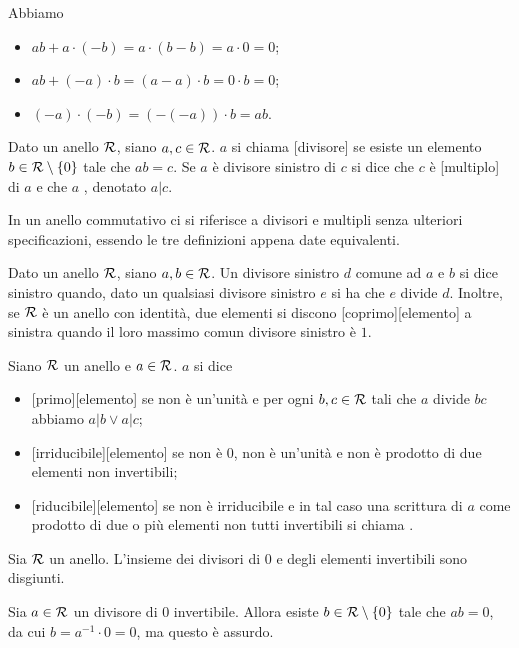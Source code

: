 \Proof Abbiamo
\begin{itemize}
	\item $ab + a \cdot (-b) = a \cdot (b - b) = a \cdot 0 = 0$;
	\item $ab + (-a) \cdot b = (a - a) \cdot b = 0 \cdot b = 0$;
	\item $(-a) \cdot (-b) = (-(-a)) \cdot b = ab$. \EndProof
\end{itemize}
\begin{Definition}
	Dato un anello $\mathcal{R}$, siano $a, c \in \mathcal{R}$. $a$ si chiama [divisore] se esiste un elemento $b \in \mathcal{R} \setminus \lbrace 0 \rbrace$ tale che $ab = c$. Se $a$ \`e divisore sinistro di $c$ si dice che $c$ \`e [multiplo] di $a$ e che $a$ , denotato $a|c$.
\end{Definition}
\par In un anello commutativo ci si riferisce a divisori e multipli senza ulteriori specificazioni, essendo le tre definizioni appena date equivalenti.
\begin{Definition}
	Dato un anello $\mathcal{R}$, siano $a, b \in \mathcal{R}$. Un divisore sinistro $d$ comune ad $a$ e $b$ si dice  sinistro quando, dato un qualsiasi divisore sinistro $e$ si ha che $e$ divide $d$. Inoltre, se $\mathcal{R}$ \`e un anello con identit\`a, due elementi si discono [coprimo][elemento] a sinistra quando il loro massimo comun divisore sinistro \`e $1$.
\end{Definition}
\begin{Definition}
	Siano $\mathcal{R}$ un anello e $a \in \mathcal{R}$. $a$ si dice
	\begin{itemize}
		\item {}[primo][elemento] se non \`e un'unit\`a e per ogni $b, c \in \mathcal{R}$ tali che $a$ divide $bc$ abbiamo $a|b \vee a |c$;
		\item {}[irriducibile][elemento] se non \`e $0$, non \`e un'unit\`a e non \`e prodotto di due elementi non invertibili;
		\item {}[riducibile][elemento] se non \`e irriducibile e in tal caso una scrittura di $a$ come prodotto di due o pi\`u elementi non tutti invertibili si chiama .
	\end{itemize}
\end{Definition}
\begin{Theorem}
	Sia $\mathcal{R}$ un anello. L'insieme dei divisori di $0$ e degli elementi invertibili sono disgiunti.
\end{Theorem}
\Proof Sia $a \in \mathcal{R}$ un divisore di $0$ invertibile. Allora esiste $b \in \mathcal{R} \setminus \lbrace 0 \rbrace$ tale che $ab = 0$, da cui $b = a^{-1} \cdot 0 = 0$, ma questo \`e assurdo. \EndProof
